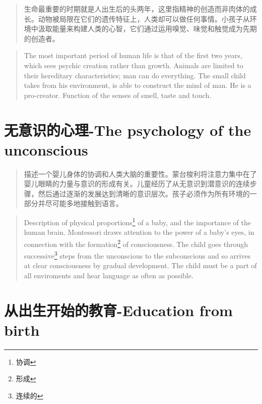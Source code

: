 \documentclass[lang=cn,10pt]{elegantbook}
\begin{document}
\begin{quote}
{\small 生命最重要的时期就是人出生后的头两年，这里指精神的创造而非肉体的成长。动物被局限在它们的遗传特征上，人类却可以做任何事情。小孩子从环境中汲取能量来构建人类的心智，它们通过运用嗅觉、味觉和触觉成为先期的创造者。}
\end{quote}

\begin{tcolorbox}
\begin{quote}
{\small The most important period of human life is that of the first two years, which sees psychic creation rather than growth. Animals are limited to their hereditary characteristics; man can do everything. The small child takes from his environment, is able to construct the mind of man. He is a pro-creator. Function of the senses of smell, taste and touch.}
\end{quote}
\end{tcolorbox}

\chapter{无意识的心理-The psychology of the unconscious}

\begin{quote}
{\small 描述一个婴儿身体的协调和人类大脑的重要性。蒙台梭利将注意力集中在了婴儿眼睛的力量与意识的形成有关。儿童经历了从无意识到潜意识的连续步骤，然后通过逐渐的发展达到清晰的意识层次。孩子必须作为所有环境的一部分并尽可能多地接触到语言。}
\end{quote}

\begin{tcolorbox}
\begin{quote}
{\small Description of physical proportions\footnote{协调} of a baby, and the importance of the human brain. Montessori draws attention to the power of a baby's eyes, in connection with the formation\footnote{形成} of consciousness. The child goes through successive\footnote{连续的} steps from the unconscious to the subconscious and so arrives at clear consciousness by gradual development. The child must be a part of all enviroments and hear language as often as possible.}
\end{quote}
\end{tcolorbox}

\chapter{从出生开始的教育-Education from birth}
\end{document}

